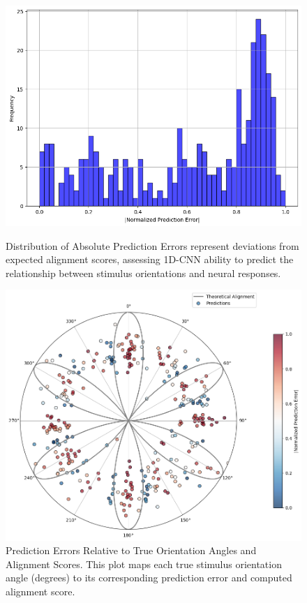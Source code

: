 \documentclass[a4paper]{article}
\begin{document}
\begin{figure}[htbp]
    \centering
    \begin{minipage}{0.43\textwidth}
        \centering
        \includegraphics[width=\linewidth]{22.png} %
        \caption{Distribution of Absolute Prediction Errors  represent deviations from expected alignment scores, assessing 1D-CNN ability to predict the relationship between stimulus orientations and neural responses.}
        \label{fig:first-image-label}
    \end{minipage}\hfill
    \begin{minipage}{0.53\textwidth}
        \centering
        \includegraphics[width=\linewidth]{predictiveerrors1D.png}
        \caption{Prediction Errors Relative to True Orientation Angles and Alignment Scores. This plot maps each true stimulus orientation angle (degrees) to its corresponding prediction error and computed alignment score.}
        \label{fig:1D-CNN histogram}
    \end{minipage}
\end{figure}
\end{document}
